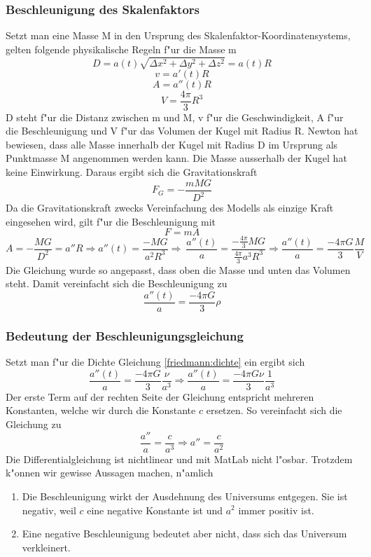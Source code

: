 \begin{refsection}
\subsubsection{Beschleunigung des Skalenfaktors}
Setzt man eine Masse M in den Ursprung des Skalenfaktor-Koordinatensystems, gelten folgende physikalische Regeln f"ur die Masse m 
\[D =  a(t) \sqrt{\Delta x^2 + \Delta y^2 + \Delta z^2}  = a(t) R\]
\[v = a'(t) R\]
\[A = a''(t) R\]
\[V = \frac{4 \pi }{3} R^3\]
D steht f"ur die Distanz zwischen m und M, v f"ur die Geschwindigkeit, A f"ur die Beschleunigung und V f"ur das Volumen der Kugel mit Radius R. Newton hat bewiesen, dass alle Masse innerhalb der Kugel mit Radius D im Ursprung als Punktmasse M angenommen werden kann. Die Masse ausserhalb der Kugel hat keine Einwirkung. Daraus ergibt sich die Gravitationskraft
\begin{equation}
F_G = -\frac{m M G}{D^2}
\end{equation}
Da die Gravitationskraft zwecks Vereinfachung des Modells als einzige Kraft eingesehen wird, gilt f"ur die Beschleunigung mit 
\[F = m A\]
\[A = - \frac{M G}{D^2} = a'' R \Rightarrow a''(t) = \frac{- M G}{a^2 R^3} \Rightarrow\ \frac{a''(t)}{a} = \frac{-\frac{4 \pi }{3} M G}{\frac{4 \pi}{3}a^3 R^3} \Rightarrow \frac{a''(t)}{a} = \frac{- 4 \pi G}{3} \frac{M}{V}\]
Die Gleichung wurde so angepasst, dass oben die Masse und unten das Volumen steht. Damit vereinfacht sich die Beschleunigung zu
\begin{equation}
\frac{a''(t)}{a} = \frac{- 4 \pi G}{3} \rho
\end{equation}
\subsubsection{Bedeutung der Beschleunigungsgleichung}
Setzt man f"ur die Dichte Gleichung \ref{friedmann:dichte} ein ergibt sich
\[\frac{a''(t)}{a} = \frac{- 4 \pi G}{3} \frac{\nu}{a^3} \Rightarrow \frac{a''(t)}{a} = \frac{- 4 \pi G \nu}{3} \frac{1}{a^3}\]
Der erste Term auf der rechten Seite der Gleichung entspricht mehreren Konstanten, welche wir durch die Konstante $c$ ersetzen. So vereinfacht sich die Gleichung zu
\[\frac{a''}{a} = \frac{c}{a^3} \Rightarrow a'' = \frac{c}{a^2}\]
Die Differentialgleichung ist nichtlinear und mit MatLab nicht l"osbar. Trotzdem k"onnen wir gewisse Aussagen machen, n"amlich
\begin{enumerate}
	\item Die Beschleunigung wirkt der Ausdehnung des Universums entgegen. Sie ist negativ, weil $c$ eine negative Konstante ist  und $a^2$  immer positiv ist. 
	\item Eine negative Beschleunigung bedeutet aber nicht, dass sich das Universum verkleinert.
\end{enumerate}


\end{refsection}
